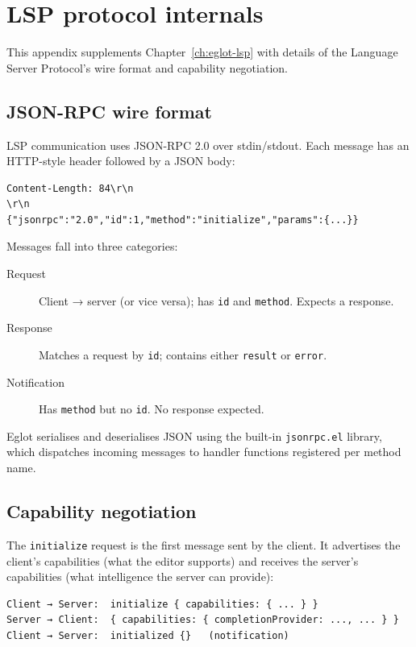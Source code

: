 \chapter{LSP protocol internals}
\label{app:lsp-protocol}

This appendix supplements Chapter~\ref{ch:eglot-lsp} with details
of the Language Server Protocol's wire format and capability
negotiation.

\section{JSON-RPC wire format}

LSP communication uses JSON-RPC 2.0 over stdin/stdout.  Each message
has an HTTP-style header followed by a JSON body:

\begin{verbatim}
Content-Length: 84\r\n
\r\n
{"jsonrpc":"2.0","id":1,"method":"initialize","params":{...}}
\end{verbatim}

Messages fall into three categories:

\begin{description}
  \item[Request] Client → server (or vice versa); has \texttt{id} and \texttt{method}.  Expects a response.
  \item[Response] Matches a request by \texttt{id}; contains either \texttt{result} or \texttt{error}.
  \item[Notification] Has \texttt{method} but no \texttt{id}.  No response expected.
\end{description}

Eglot serialises and deserialises JSON using the built-in
\texttt{jsonrpc.el} library, which dispatches incoming messages to
handler functions registered per method name.

\section{Capability negotiation}

The \texttt{initialize} request is the first message sent by the
client.  It advertises the client's capabilities (what the editor
supports) and receives the server's capabilities (what intelligence
the server can provide):

\begin{verbatim}
Client → Server:  initialize { capabilities: { ... } }
Server → Client:  { capabilities: { completionProvider: ..., ... } }
Client → Server:  initialized {}   (notification)
\end{verbatim}

